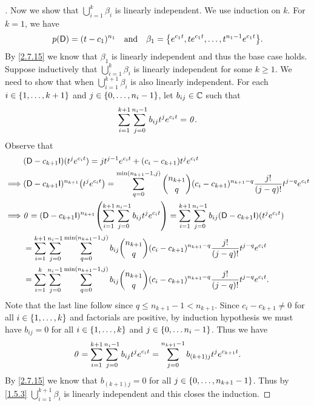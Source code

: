 \begin{proof}[]
  Now we show that \(\bigcup_{i = 1}^k \beta_i\) is linearly independent.
  We use induction on \(k\).
  For \(k = 1\), we have
  \[
    p(\Dop) = (t - c_1)^{n_1} \quad \text{and} \quad \beta_1 = \set{e^{c_1 t}, t e^{c_1 t}, \dots, t^{n_1 - 1} e^{c_1 t}}.
  \]
  By \cref{2.7.15} we know that \(\beta_1\) is linearly independent and thus the base case holds.
  Suppose inductively that \(\bigcup_{i = 1}^k \beta_i\) is linearly independent for some \(k \geq 1\).
  We need to show that when \(\bigcup_{i = 1}^{k + 1} \beta_i\) is also linearly independent.
  For each \(i \in \left\lbrace1, \dots, k + 1\right\rbrace\) and \(j \in \left\lbrace0, \dots, n_i - 1\right\rbrace\), let \(b_{i j} \in \mathbb{C}\) such that
  \[
    \sum_{i = 1}^{k + 1} \sum_{j = 0}^{n_i - 1} b_{i j} t^j e^{c_i t} = \mathit{0}.
  \]
  Observe that
  \begin{align*}
             & (\Dop - c_{k + 1} \IT)(t^j e^{c_i t}) = j t^{j - 1} e^{c_i t} + (c_i - c_{k + 1}) t^j e^{c_i t}                                                                                                             \\
    \implies & (\Dop - c_{k + 1} \IT)^{n_{k + 1}} \pa{t^j e^{c_i t}} = \sum_{q = 0}^{\min(n_{k + 1} - 1, j)} \binom{n_{k + 1}}{q} (c_i - c_{k + 1})^{n_{k + 1} - q} \frac{j!}{(j - q)!} t^{j - q} e^{c_i t}                \\
    \implies & \zv = (\Dop - c_{k + 1} \IT)^{n_{k + 1}} \pa{\sum_{i = 1}^{k + 1} \sum_{j = 0}^{n_i - 1} b_{i j} t^j e^{c_i t}} = \sum_{i = 1}^{k + 1} \sum_{j = 0}^{n_i - 1} b_{i j} (\Dop - c_{k + 1} \IT)(t^j e^{c_i t}) \\
             & = \sum_{i = 1}^{k + 1} \sum_{j = 0}^{n_i - 1} \sum_{q = 0}^{\min(n_{k + 1} - 1, j)} b_{i j} \binom{n_{k + 1}}{q} (c_i - c_{k + 1})^{n_{k + 1} - q} \frac{j!}{(j - q)!} t^{j - q} e^{c_i t}                  \\
             & = \sum_{i = 1}^k \sum_{j = 0}^{n_i - 1} \sum_{q = 0}^{\min(n_{k + 1} - 1, j)} b_{i j} \binom{n_{k + 1}}{q} (c_i - c_{k + 1})^{n_{k + 1} - q} \frac{j!}{(j - q)!} t^{j - q} e^{c_i t}.
  \end{align*}
  Note that the last line follow since \(q \leq n_{k + 1} - 1 < n_{k + 1}\).
  Since \(c_i - c_{k + 1} \neq 0\) for all \(i \in \left\lbrace1, \dots, k\right\rbrace\) and factorials are positive, by induction hypothesis we must have \(b_{i j} = 0\) for all \(i \in \left\lbrace1, \dots, k\right\rbrace\) and \(j \in \left\lbrace0, \dots n_i - 1\right\rbrace\).
  Thus we have
  \[
    \mathit{0} = \sum_{i = 1}^{k + 1} \sum_{j = 0}^{n_i - 1} b_{i j} t^j e^{c_i t} = \sum_{j = 0}^{n_{k + 1} - 1} b_{(k + 1) j} t^j e^{c_{k + 1} t}.
  \]
  By \cref{2.7.15} we know that \(b_{(k + 1) j} = 0\) for all \(j \in \left\lbrace0, \dots, n_{k + 1} - 1\right\rbrace\).
  Thus by \cref{1.5.3} \(\bigcup_{i = 1}^{k + 1} \beta_i\) is linearly independent and this closes the induction.
\end{proof}

